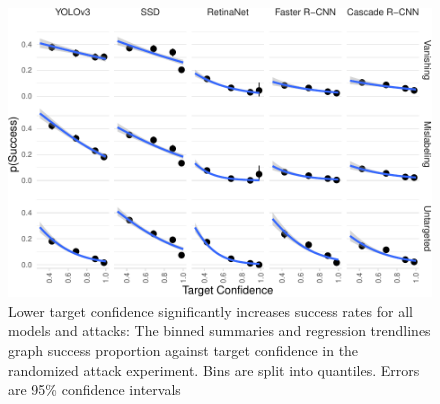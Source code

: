 \begin{figure}[tb]

{\centering \includegraphics{imgs/target_conf_graph-1} 

}

\caption{Lower target confidence significantly increases success rates for all models and attacks:  The binned summaries and regression trendlines graph success proportion against target confidence in the randomized attack experiment. Bins are split into quantiles. Errors are 95\% confidence intervals}\label{fig:target_conf_graph}
\end{figure}

\begingroup\fontsize{9}{11}\selectfont

